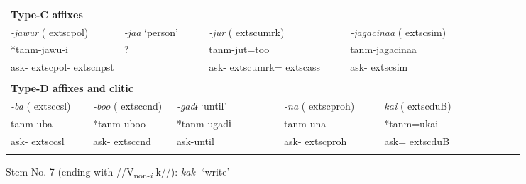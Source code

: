 \begin{tabularx}{\textwidth}{XXXXXXXXXXXXXXXXXXXXX}
\multicolumn{21}{X}{{\bfseries Type-C affixes}}\\
\multicolumn{4}{X}{{ \textit{{}-jawur} (	extsc{pol})}} & \multicolumn{3}{X}{{ \textit{{}-jaa} ‘person’}} & \multicolumn{3}{X}{{ \textit{{}-jur} (	extsc{umrk})}} & \multicolumn{4}{X}{{ \textit{{}-jagacinaa} (	extsc{sim})}} & \multicolumn{7}{X}{}\\
\multicolumn{4}{X}{{ *tanm-jawu-i}} & \multicolumn{3}{X}{{ ?}} & \multicolumn{3}{X}{tanm-jut=too} & \multicolumn{4}{X}{{ tanm-jagacinaa}} & \multicolumn{7}{X}{}\\
\multicolumn{4}{X}{ask-	extsc{pol}-	extsc{npst}} & \multicolumn{3}{X}{} & \multicolumn{3}{X}{ask-	extsc{umrk}=	extsc{ass}} & \multicolumn{4}{X}{ask-	extsc{sim}} & \multicolumn{7}{X}{}\\
\multicolumn{21}{X}{}\\
\multicolumn{21}{X}{{\bfseries Type-D affixes and clitic}}\\
\multicolumn{3}{X}{{ \textit{{}-ba} (	extsc{csl})}} & \multicolumn{3}{X}{{ \textit{{}-boo} (	extsc{cnd})}} & \multicolumn{2}{X}{{ \textit{{}-gadɨ} ‘until’}} & \multicolumn{3}{X}{{ \textit{{}-na} (	extsc{proh})}} & \multicolumn{5}{X}{{ \textit{kai} (	extsc{du}B)}} & \multicolumn{5}{X}{}\\
\multicolumn{3}{X}{{ tanm-uba}} & \multicolumn{3}{X}{{ *tanm-uboo}} & \multicolumn{2}{X}{{ *tanm-ugadɨ}} & \multicolumn{3}{X}{{ tanm-una}} & \multicolumn{5}{X}{{ *tanm=ukai}} & \multicolumn{5}{X}{}\\
\multicolumn{3}{X}{ask-	extsc{csl}} & \multicolumn{3}{X}{ask-	extsc{cnd}} & \multicolumn{2}{X}{ask-until} & \multicolumn{3}{X}{ask-	extsc{proh}} & \multicolumn{5}{X}{ask=	extsc{du}B} & \multicolumn{5}{X}{}\\
\lspbottomrule
\end{tabularx}
Stem No. 7 (ending with //V\textsubscript{non-}\textit{\textsubscript{i} }k//): \textit{kak-} ‘write’

\tablefirsthead{}

